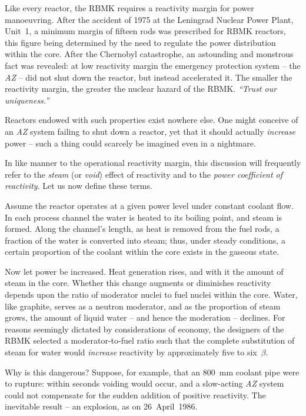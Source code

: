 \documentclass[openright]{bookest}
\begin{document}
Like every reactor, the RBMK requires a reactivity margin for power manoeuvring. After the accident of 1975 at the Leningrad Nuclear Power Plant, Unit~1, a minimum margin of fifteen rods was prescribed for RBMK reactors, this figure being determined by the need to regulate the power distribution within the core. After the Chernobyl catastrophe, an astounding and monstrous fact was revealed: at low reactivity margin the emergency protection system -- the \textit{AZ} -- did not shut down the reactor, but instead accelerated it. The smaller the reactivity margin, the greater the nuclear hazard of the RBMK. \textit{``Trust our uniqueness.''}

Reactors endowed with such properties exist nowhere else. One might conceive of an \textit{AZ} system failing to shut down a reactor, yet that it should actually \textit{increase} power -- such a thing could scarcely be imagined even in a nightmare.

In like manner to the operational reactivity margin, this discussion will frequently refer to the \textit{steam} (or \textit{void}) effect of reactivity and to the \textit{power coefficient of reactivity}. Let us now define these terms.

Assume the reactor operates at a given power level under constant coolant flow. In each process channel the water is heated to its boiling point, and steam is formed. Along the channel's length, as heat is removed from the fuel rods, a fraction of the water is converted into steam; thus, under steady conditions, a certain proportion of the coolant within the core exists in the gaseous state.

Now let power be increased. Heat generation rises, and with it the amount of steam in the core. Whether this change augments or diminishes reactivity depends upon the ratio of moderator nuclei to fuel nuclei within the core. Water, like graphite, serves as a neutron moderator, and as the proportion of steam grows, the amount of liquid water -- and hence the moderation -- declines. For reasons seemingly dictated by considerations of economy, the designers of the RBMK selected a moderator-to-fuel ratio such that the complete substitution of steam for water would \textit{increase} reactivity by approximately five to six~$\beta$.

Why is this dangerous? Suppose, for example, that an \qty{800}{\milli\metre} coolant pipe were to rupture: within seconds voiding would occur, and a slow-acting \textit{AZ} system could not compensate for the sudden addition of positive reactivity. The inevitable result -- an explosion, as on 26~April~1986.
\end{document}
